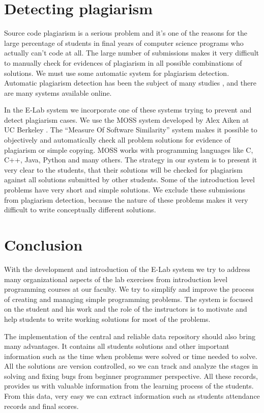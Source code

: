 \documentclass{article}
\begin{document}
\section{Detecting plagiarism}
Source code plagiarism is a serious problem and it's one of the reasons for the
large percentage of students in final years of computer science programs who
actually can't code at all. The large number of submissions makes it very
difficult to manually check for evidences of plagiarism in all possible
combinations of solutions. We must use some automatic system for
plagiarism detection. Automatic plagiarism detection has been the subject of
many studies \cite{baker1995finding}, \cite{clough2000plagiarism} and there are
many systems available online. 

In the E-Lab system we incorporate one of these systems trying to prevent and
detect plagiarism cases. We use the MOSS system developed by Alex Aiken at UC
Berkeley \cite{aiken2005moss}. The ``Measure Of Software Similarity'' system
makes it possible to objectively and automatically check all problem solutions
for evidence of plagiarism or simple copying. MOSS works with programming
languages like C, C++, Java, Python and many others. The strategy in our system
is to present it very clear to the students, that their solutions will be
checked for plagiarism against all solutions submitted by other students. Some
of the introduction level problems have very short and simple solutions. We exclude
these submissions from plagiarism detection, because the nature of these
problems makes it very difficult to write conceptually different solutions.

\section{Conclusion}

With the development and introduction of the E-Lab system we try to address
many organizational aspects of the lab exercises from introduction
level programming courses at our faculty. We try to simplify and improve the process
of creating and managing simple programming problems. The system is focused on
the student and his work and the role of the instructors is to motivate and help
students to write working solutions for most of the problems. 

The implementation of the
central and reliable data repository should also bring many advantages. It
contains all students solutions and other important information such as the time when
problems were solved or time needed to solve. All the solutions are version
controlled, so we can track and analyze the stages in solving and fixing bugs
from beginner programmer perspective. All these records, provides us with
valuable information from the learning process of the students. From this data,
very easy we can extract information such as students attendance records and
final scores.
\end{document}
